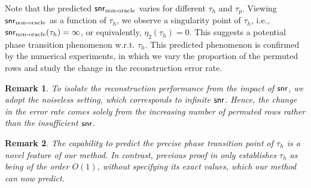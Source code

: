 \documentclass[11pt]{article}
\newtheorem{remark}{Remark}
\begin{document}
Note that the predicted $\mathsf{snr}_{\textup{non-oracle}}$ varies for different $\tau_h$ and $\tau_p$.
Viewing $\mathsf{snr}_{\textup{non-oracle}}$ as a function of
$\tau_h$, we observe a singularity point of
$\tau_h$, i.e., $\mathsf{snr}_{\textup{non-oracle}}(\tau_h)=\infty$, or equivalently, $\eta_2(\tau_h) = 0$. This suggests a potential phase transition
phenomenon w.r.t. $\tau_h$.
This predicted phenomenon is confirmed by the numerical experiments, in which we vary the proportion of the permuted rows and study the change in the reconstruction error rate.


\begin{remark}
To isolate the reconstruction performance from the impact of $\mathsf{snr}$, we adopt the noiseless setting,
which corresponds to infinite $\mathsf{snr}$. Hence, the change in the error rate comes solely from the increasing number of permuted rows rather than the insufficient $\mathsf{snr}$.
\end{remark}

\begin{remark}
The capability to predict the precise phase transition point of $\tau_h$ is a novel feature of our method. In contrast, previous proof in \citet{zhang2020optimal} only establishes $\tau_h$ as being of the order $O(1)$, without specifying its exact values, which our method can now predict.
\end{remark}
\end{document}
